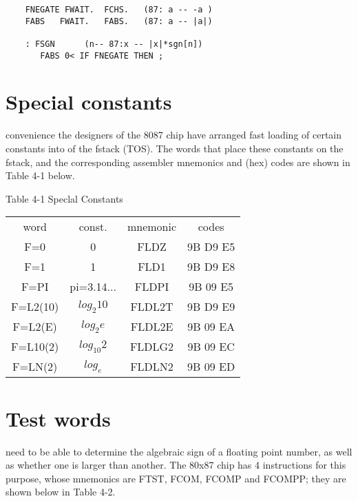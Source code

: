 \begin{lstlisting}
    FNEGATE FWAIT.  FCHS.   (87: a -- -a )
    FABS   FWAIT.   FABS.   (87: a -- |a|)

    : FSGN      (n-- 87:x -- |x|*sgn[n])
       FABS 0< IF FNEGATE THEN ;
\end{lstlisting}

\section{Special constants}

 convenience the designers of the 8087 chip have arranged fast loading of certain constants into  of the fstack (TOS). The words that place these constants on the fstack, and the corresponding assembler mnemonics and (hex) codes are shown in Table 4-1 below.

Table 4-1 Speclal Constants
\begin{center}
    \begin{tabular}{|c c c c|}
        \hline
        word      & const.      & mnemonic & codes     \\
        F=0       & 0           & FLDZ     & 9B D9 E5  \\
        F=1       & 1           & FLD1     & 9B D9 E8  \\
        F=PI      & pi=3.14...  & FLDPI    & 9B 09 E5  \\
        F=L2(10)  & $log_{2}10$ & FLDL2T   & 9B D9 E9  \\ 
        F=L2(E)   & $log_{2}e$  & FLDL2E   & 9B 09 EA  \\
        F=L10(2)  & $log_{10}2$ & FLDLG2   & 9B 09 EC  \\
        F=LN(2)   & $log_{e}$   & FLDLN2   & 9B 09 ED  \\
        \hline
    \end{tabular}
\end{center}

\section{Test words}

 need to be able to determine the algebraic sign of a floating point number, as well as whether one is larger than another.
The 80x87 chip has 4 instructions for this purpose, whose mnemonics are FTST, FCOM, FCOMP and FCOMPP; they are shown below in Table 4-2.

